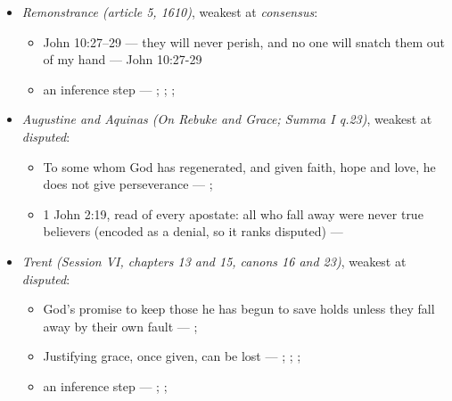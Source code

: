 \documentclass[11pt]{article}
\begin{document}
\begin{itemize}
\begin{itemize}
\item God’s promise to keep those he has begun to save holds unless they fall away by their own fault --- \cite[Solid Declaration XI.42]{concordia-triglotta-1921}
\item In his sin David lost the Holy Spirit and his faith --- \cite[Smalcald Articles III.iii.43]{concordia-triglotta-1921}
\end{itemize}
\item \emph{Remonstrance (article 5, 1610)}, weakest at \emph{consensus}:
\begin{itemize}
\item John 10:27–29 — they will never perish, and no one will snatch them out of my hand --- John 10:27-29
\item an inference step --- \cite[548--549]{schaff-creeds-christendom-3-1977}; \cite[603]{arminius-works-1-1825}; \cite[Solid Declaration XI.45]{concordia-triglotta-1921}; \cite[444--445]{wesley-works-9-1827}
\end{itemize}
\item \emph{Augustine and Aquinas (On Rebuke and Grace; Summa I q.23)}, weakest at \emph{disputed}:
\begin{itemize}
\item To some whom God has regenerated, and given faith, hope and love, he does not give perseverance --- \cite[478]{npnf1-05-1887}; \cite[On Rebuke and Grace, ch. 18]{npnf1-05-1887}
\item 1 John 2:19, read of every apostate: all who fall away were never true believers (encoded as a denial, so it ranks disputed) --- \cite[479--480]{npnf1-05-1887}
\end{itemize}
\item \emph{Trent (Session VI, chapters 13 and 15, canons 16 and 23)}, weakest at \emph{disputed}:
\begin{itemize}
\item God’s promise to keep those he has begun to save holds unless they fall away by their own fault --- \cite[Trent, Session VI (1547), ch. 13]{tanner-decrees-1990}; \cite[40]{waterworth-trent-1848}
\item Justifying grace, once given, can be lost --- \cite[Trent, Session VI (1547), ch. 15]{tanner-decrees-1990}; \cite[42]{waterworth-trent-1848}; \cite[Trent, Session VI (1547), canon 23]{tanner-decrees-1990}; \cite[47]{waterworth-trent-1848}
\item an inference step --- \cite[329--330]{calvin-corinthians-1-1848}; \cite[Trent, Session VI (1547), ch. 13]{tanner-decrees-1990}; \cite[40--41]{waterworth-trent-1848}

\end{itemize}
\end{itemize}
\end{document}
